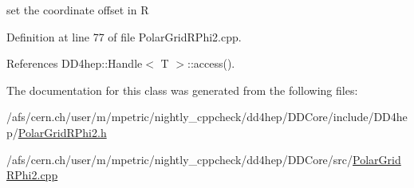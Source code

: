 set the coordinate offset in R 

Definition at line 77 of file PolarGridRPhi2.cpp.

References DD4hep::Handle$<$ T $>$::access().

The documentation for this class was generated from the following files:\begin{DoxyCompactItemize}
\item 
/afs/cern.ch/user/m/mpetric/nightly\_\-cppcheck/dd4hep/DDCore/include/DD4hep/\hyperlink{_d_d_core_2include_2_d_d4hep_2_polar_grid_r_phi2_8h}{PolarGridRPhi2.h}\item 
/afs/cern.ch/user/m/mpetric/nightly\_\-cppcheck/dd4hep/DDCore/src/\hyperlink{_d_d_core_2src_2_polar_grid_r_phi2_8cpp}{PolarGridRPhi2.cpp}\end{DoxyCompactItemize}
